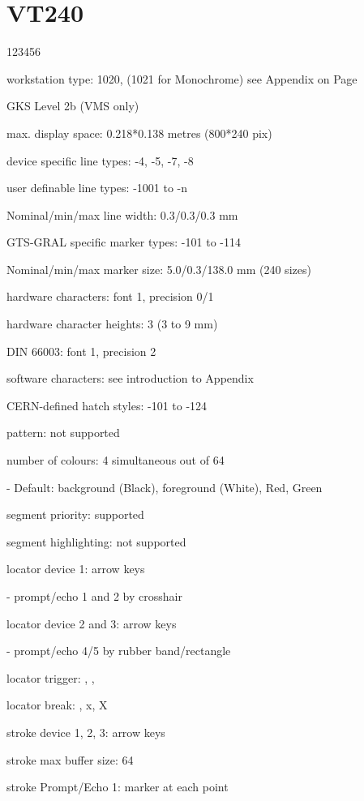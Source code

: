 \section{VT240}
\begin{DLtt}{123456}
\item[workstation type:]1020, (1021 for Monochrome)
see Appendix on Page~\pageref{sec:gtstyp}
\item[GKS Level]2b (VMS only)
\item[max. display space:]0.218*0.138 metres (800*240 pix)
\item[device specific line types:]-4, -5, -7, -8
\item[user definable line types:]-1001 to -n
\item[Nominal/min/max line width:]0.3/0.3/0.3 mm
\item[GTS-GRAL specific marker types:]-101 to -114
\item[Nominal/min/max marker size:]5.0/0.3/138.0 mm (240 sizes)
\item[hardware characters:]font 1, precision 0/1
\item[hardware character heights:]3 (3 to 9 mm)
\item[DIN 66003:]font 1, precision 2
\item[software characters:]see introduction to Appendix
\item[CERN-defined hatch styles:]-101 to -124
\item[pattern:]not supported
\item[number of colours:]4 simultaneous out of 64
\item[-]Default: background (Black), foreground (White), Red, Green
\item[segment priority:]supported
\item[segment highlighting:]not supported
\item[locator device 1:]arrow keys
\item[-]prompt/echo 1 and 2 by crosshair
\item[locator device 2 and 3:]arrow keys
\item[-]prompt/echo 4/5 by rubber band/rectangle
\item[locator trigger:], , 
\item[locator break:], x, X
\item[stroke device 1, 2, 3:]arrow keys
\item[stroke max buffer size:]64
\item[stroke Prompt/Echo 1:]marker at each point

\end{DLtt}
